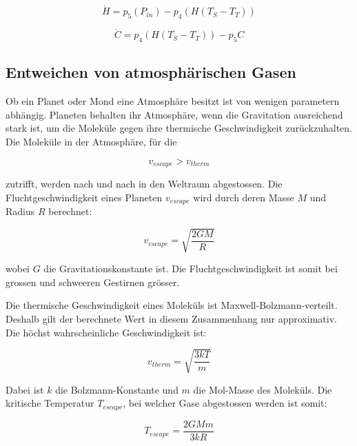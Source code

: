 \begin{refsection}
\begin{equation}
\dot{H} = p_5 (P_{in}) - p_4 \left( H(T_S - T_T) \right)
\end{equation}

\begin{equation}
\dot{C} = p_4 \left( H(T_S - T_T) \right) - p_5 C
\end{equation}


\subsection{Entweichen von atmosphärischen Gasen}

Ob ein Planet oder Mond eine Atmosphäre besitzt ist von wenigen parametern abhängig. Planeten behalten ihr Atmosphäre, wenn die Gravitation ausreichend stark ist, um die Moleküle gegen ihre thermische Geschwindigkeit zurückzuhalten.
Die Moleküle in der Atmosphäre, für die


\begin{equation}
v_{escape} > v_{therm}
\end{equation}

zutrifft, werden nach und nach in den Weltraum abgestossen.
Die Fluchtgeschwindigkeit eines Planeten $v_{escape}$ wird durch deren Masse $M$ und Radius $R$ berechnet: 

\begin{equation}
v_{escape} = \sqrt{\frac{2GM}{R}}
\end{equation}

wobei $G$ die Gravitationskonstante ist. Die Fluchtgeschwindigkeit ist somit bei grossen und schweeren Gestirnen grösser.

Die thermische Geschwindigkeit eines Moleküls ist Maxwell-Bolzmann-verteilt. Deshalb gilt der berechnete Wert in diesem Zusammenhang nur approximativ. Die höchst wahrscheinliche Geschwindigkeit ist: 

\begin{equation}
v_{therm} = \sqrt{\frac{3kT}{m}}
\end{equation}

Dabei ist $k$ die Bolzmann-Konstante und $m$ die Mol-Masse des Moleküls. Die kritische Temperatur $T_{escape}$, bei welcher Gase abgestossen werden ist somit:

\begin{equation}
T_{escape} = \frac{2GMm}{3kR}
\end{equation}




\end{refsection}
